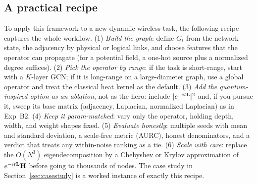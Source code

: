 \subsection{A practical recipe}
To apply this framework to a new dynamic-wireless task, the following recipe captures the
whole workflow. (1) \emph{Build the graph}: define $G_t$ from the network state, the
adjacency by physical or logical links, and choose features that the operator can
propagate (for a potential field, a one-hot source plus a normalized degree suffices).
(2) \emph{Pick the operator by range}: if the task is short-range, start with a $K$-layer
GCN; if it is long-range on a large-diameter graph, use a global operator and treat the
classical heat kernel as the default. (3) \emph{Add the quantum-inspired option as an
ablation}, not as the hero: include $|e^{-it\mathbf{L}}|^2$ and, if you pursue it, sweep its
base matrix (adjacency, Laplacian, normalized Laplacian) as in Exp~B2. (4) \emph{Keep it
param-matched}: vary only the operator, holding depth, width, and weight shapes fixed.
(5) \emph{Evaluate honestly}: multiple seeds with mean and standard deviation, a
scale-free metric (AURC), honest denominators, and a verdict that treats any within-noise
ranking as a tie. (6) \emph{Scale with care}: replace the $O(N^3)$ eigendecomposition by a
Chebyshev or Krylov approximation of $e^{-it\mathbf{L}}\mathbf{H}$ before going to thousands of
nodes. The case study in Section~\ref{sec:casestudy} is a worked instance of exactly this
recipe.
